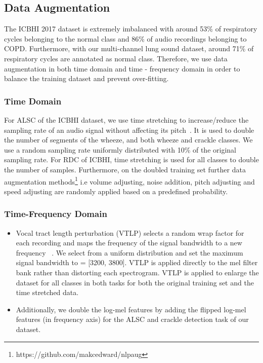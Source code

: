 \documentclass[journal]{IEEEtran}
\begin{document}
\subsection{Data Augmentation}
The ICBHI 2017 dataset is extremely imbalanced with around 53\% of respiratory cycles belonging to the normal class and 86\% of audio recordings belonging to COPD. Furthermore, with our multi-channel lung sound dataset, around 71\% of respiratory cycles are annotated as normal class. Therefore, we use data augmentation in both time domain and time - frequency domain in order to balance the training dataset and prevent over-fitting. 
\subsubsection{Time Domain} 
For ALSC of the ICBHI dataset, we use time stretching to increase/reduce the sampling rate of an audio signal without affecting its pitch~\cite{driedger2016review}. It is used to double the number of segments of the wheeze, and both wheeze and crackle classes. We use a random sampling rate uniformly distributed with 10\% of the original sampling rate. For RDC of ICBHI, time stretching is used for all classes to double the number of samples. Furthermore, on the doubled training set further data augmentation methods\footnote{https://github.com/makcedward/nlpaug} i.e volume adjusting, noise addition, pitch adjusting and speed adjusting are randomly applied based on a predefined probability.

\subsubsection{Time-Frequency Domain}
\begin{itemize}
	\item Vocal tract length perturbation (VTLP) selects a random wrap factor  for each recording and maps the frequency  of the signal bandwidth to a new frequency ~\cite{jaitly2013vocal}. 
    We select  from a uniform distribution  and set the maximum signal bandwidth to  = [3200, 3800]. VTLP is applied directly to the mel filter bank rather than distorting each spectrogram. VTLP is applied to enlarge the dataset for all classes in both tasks for both the original training set and the time stretched data.
	\item Additionally, we double the log-mel features by adding the flipped log-mel features (in frequency axis) for the ALSC and crackle detection task of our dataset.  
\end{itemize}  
\end{document}
